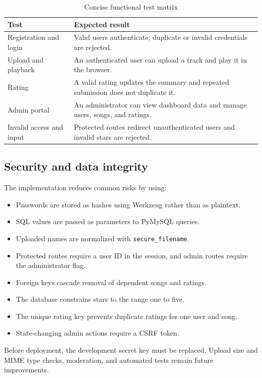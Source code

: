 \documentclass[12pt,a4paper]{article}
\begin{document}
\begin{table}[H]
\small
\centering
\begin{tabularx}{\textwidth}{p{}X p{}}
\toprule
\textbf{Test} & \textbf{Expected result} \\
\midrule
Registration and login & Valid users authenticate; duplicate or invalid credentials are rejected. \\
Upload and playback & An authenticated user can upload a track and play it in the browser. \\
Rating & A valid rating updates the summary and repeated submission does not duplicate it. \\
Admin portal & An administrator can view dashboard data and manage users, songs, and ratings. \\
Invalid access and input & Protected routes redirect unauthenticated users and invalid stars are rejected. \\
\bottomrule
\end{tabularx}
\caption{Concise functional test matrix}
\end{table}

\subsection{Security and data integrity}
The implementation reduces common risks by using:
\begin{itemize}[leftmargin=*]
  \item Passwords are stored as hashes using Werkzeug rather than as plaintext.
  \item SQL values are passed as parameters to PyMySQL queries.
  \item Uploaded names are normalized with \texttt{secure\_filename}.
  \item Protected routes require a user ID in the session, and admin routes
  require the administrator flag.
  \item Foreign keys cascade removal of dependent songs and ratings.
  \item The database constrains stars to the range one to five.
  \item The unique rating key prevents duplicate ratings for one user and song.
  \item State-changing admin actions require a CSRF token.
\end{itemize}

Before deployment, the development secret key must be replaced. Upload size
and MIME type checks, moderation, and automated tests remain future
improvements.
\end{document}
